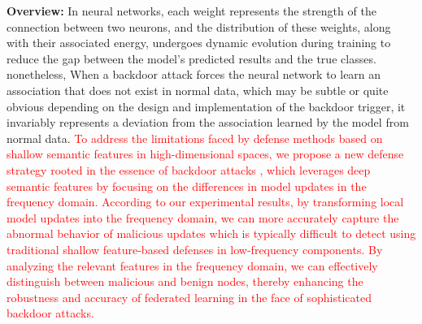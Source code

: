 \documentclass[lettersize,journal]{IEEEtran}
\begin{document}
\textbf{Overview:} 
In neural networks, each weight represents the strength of the connection between two neurons, and the distribution of these weights, along with their associated energy, undergoes dynamic evolution during training to reduce the gap between the model's predicted results and the true classes. nonetheless, When a backdoor attack forces the neural network to learn an association that does not exist in normal data, which may be subtle or quite obvious depending on the design and implementation of the backdoor trigger, it invariably represents a deviation from the association learned by the model from normal data. \textcolor{red}{To address the limitations faced by defense methods based on shallow semantic features in high-dimensional spaces, we propose a new defense strategy rooted in the essence of backdoor attacks \cite{zeng2021rethinking}, which leverages deep semantic features by focusing on the differences in model updates in the frequency domain. According to our experimental results, by transforming local model updates into the frequency domain, we can more accurately capture the abnormal behavior of malicious updates which is typically difficult to detect using traditional shallow feature-based defenses in low-frequency components. By analyzing the relevant features in the frequency domain, we can effectively distinguish between malicious and benign nodes, thereby enhancing the robustness and accuracy of federated learning in the face of sophisticated backdoor attacks.}
\end{document}
